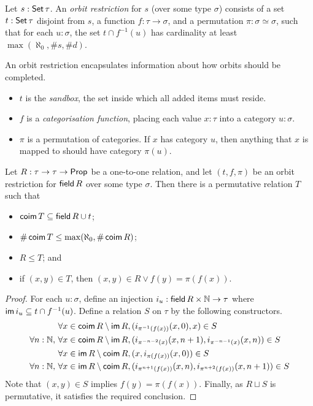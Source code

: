 \begin{definition}
  \label{def:OrbitRestriction}
  Let \( s : \operatorname{\mathsf{Set}} \tau \).
  An \emph{orbit restriction} for \( s \) (over some type \( \sigma \)) consists of a set \( t : \operatorname{\mathsf{Set}} \tau \) disjoint from \( s \), a function \( f : \tau \to \sigma \), and a permutation \( \pi : \sigma \simeq \sigma \), such that for each \( u : \sigma \), the set \( t \cap f^{-1}(u) \) has cardinality at least \( \max(\aleph_0, \#s, \#d) \).

  An orbit restriction encapsulates information about how orbits should be completed.
  \begin{itemize}
    \item \( t \) is the \emph{sandbox}, the set inside which all added items must reside.
    \item \( f \) is a \emph{categorisation function}, placing each value \( x : \tau \) into a category \( u : \sigma \).
    \item \( \pi \) is a permutation of categories. If \( x \) has category \( u \), then anything that \( x \) is mapped to should have category \( \pi(u) \).
  \end{itemize}
\end{definition}
\begin{proposition}
  \label{prop:completing_restricted_orbits}
  Let \( R : \tau \to \tau \to \mathsf{Prop} \) be a one-to-one relation, and let \( (t, f, \pi) \) be an orbit restriction for \( \operatorname{\mathsf{field}} R \) over some type \( \sigma \).
  Then there is a permutative relation \( T \) such that
  \begin{itemize}
    \item \( \operatorname{\mathsf{coim}} T \subseteq \operatorname{\mathsf{field}} R \cup t \);
    \item \( \#\operatorname{\mathsf{coim}} T \leq \max(\aleph_0, \#\operatorname{\mathsf{coim}} R) \);
    \item \( R \leq T \); and
    \item if \( (x, y) \in T \), then \( (x, y) \in R \vee f(y) = \pi(f(x)) \).
  \end{itemize}
\end{proposition}
\begin{proof}
  For each \( u : \sigma \), define an injection \( i_u : \operatorname{\mathsf{field}} R \times \mathbb N \to \tau \) where \( \operatorname{\mathsf{im}} i_u \subseteq t \cap f^{-1}(u) \).
  Define a relation \( S \) on \( \tau \) by the following constructors.
  \begin{align*}
    \forall x \in \operatorname{\mathsf{coim}} R \setminus \operatorname{\mathsf{im}} R,\, &(i_{\pi^{-1}(f(x))}(x, 0), x) \in S \\
    \forall n : \mathbb N,\, \forall x \in \operatorname{\mathsf{coim}} R \setminus \operatorname{\mathsf{im}} R,\, &(i_{\pi^{-n-2}(x)}(x, n+1), i_{\pi^{-n-1}(x)}(x, n)) \in S \\
    \forall x \in \operatorname{\mathsf{im}} R \setminus \operatorname{\mathsf{coim}} R,\, &(x, i_{\pi(f(x))}(x, 0)) \in S \\
    \forall n : \mathbb N,\, \forall x \in \operatorname{\mathsf{im}} R \setminus \operatorname{\mathsf{coim}} R,\, &(i_{\pi^{n+1}(f(x))}(x, n), i_{\pi^{n+2}(f(x))}(x, n+1)) \in S
  \end{align*}
  Note that \( (x, y) \in S \) implies \( f(y) = \pi(f(x)) \).
  Finally, as \( R \sqcup S \) is permutative, it satisfies the required conclusion.
\end{proof}
